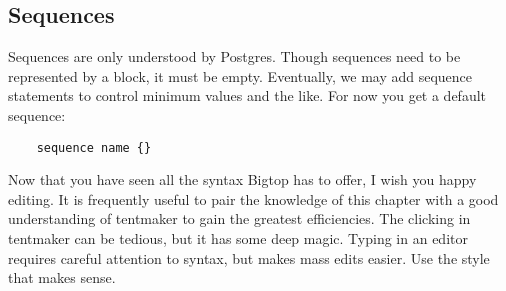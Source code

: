 \subsection*{Sequences}

Sequences are only understood by Postgres.  Though sequences need to be
represented by a block, it must be empty.  Eventually, we may add sequence
statements to control minimum values and the like.  For now you get a
default sequence:

\begin{verbatim}
    sequence name {}
\end{verbatim}

Now that you have seen all the syntax Bigtop has to offer, I wish you
happy editing.  It is frequently useful to pair the knowledge of this
chapter with a good understanding of tentmaker to gain the greatest
efficiencies.  The clicking in tentmaker can be tedious, but it has
some deep magic.  Typing in an editor requires careful attention to
syntax, but makes mass edits easier.  Use the style that makes sense.
